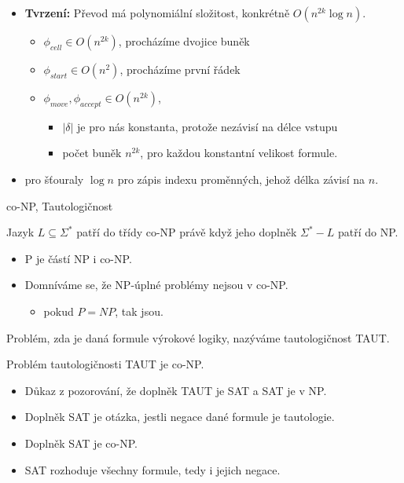    \begin{frame}{}
    \begin{proofe}
    \begin{itemize}
    \item {\bf Tvrzení:} Převod má polynomiální složitost, konkrétně $O(n^{2k}\log n)$.
    \begin{itemize}
        \item $\phi_{cell}\in O(n^{2k})$, procházíme dvojice buněk
        \item $\phi_{start}\in O(n^{2})$, procházíme první řádek
        \item $\phi_{move},\phi_{accept}\in O(n^{2k})$, 
    \begin{itemize}
        \item 	$|\delta|$ je pro nás konstanta, protože nezávisí na délce vstupu
    \item počet buněk $n^{2k}$, pro každou konstantní velikost formule.
    \end{itemize}
        
    \end{itemize}
    \item pro šťouraly $\log n$ pro zápis indexu proměnných, jehož délka závisí na $n$.
    \end{itemize}
    \end{proofe}
    \end{frame}
    
    \begin{frame}{co-NP, Tautologičnost}
    \begin{definition}
    Jazyk $L\subseteq \Sigma^*$ patří do třídy \alert{co-NP} právě když jeho doplněk $\Sigma^*-L$ patří do NP.
    \end{definition}
    \begin{itemize}
        \item P je částí NP i co-NP.
        \item Domníváme se, že NP-úplné problémy nejsou v co-NP.
        
        \begin{itemize}
            \item pokud $P=NP$, tak jsou.
        \end{itemize}
    \end{itemize}
    \begin{definition}[tautologičnost]
    Problém, zda je daná formule výrokové logiky, nazýváme \alert{tautologičnost TAUT}.
    \end{definition}
    \begin{theorem}
    Problém tautologičnosti TAUT je co-NP.
    \end{theorem}
    \begin{itemize}
        \item Důkaz z pozorování, že doplněk TAUT je SAT a SAT je v NP.
        \item Doplněk SAT je otázka, jestli negace dané formule je tautologie.
    \item Doplněk SAT je co-NP.
    \item SAT rozhoduje všechny formule, tedy i jejich negace.
    \end{itemize}
    \end{frame}
    
